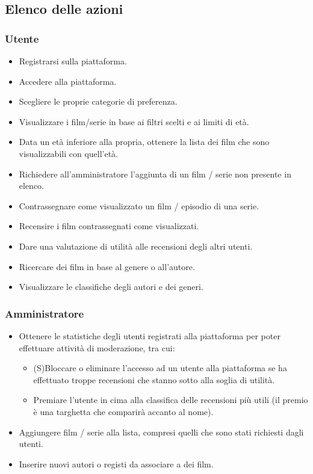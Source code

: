\documentclass[a4paper,12pt]{report}
\begin{document}
\subsection{Elenco delle azioni}
\subsubsection{Utente}
\begin{itemize}
	\item Registrarsi sulla piattaforma.
	\item Accedere alla piattaforma.
	\item Scegliere le proprie categorie di preferenza.
	\item Visualizzare i film/serie in base ai filtri scelti e ai limiti di età.
	\item Data un età inferiore alla propria, ottenere la lista dei film che sono visualizzabili con quell'età.
	\item Richiedere all'amministratore l'aggiunta di un film / serie non presente in elenco.
	\item Contrassegnare come visualizzato un film / episodio di una serie.
	\item Recensire i film contrassegnati come visualizzati.
	\item Dare una valutazione di utilità alle recensioni degli altri utenti.
	\item Ricercare dei film in base al genere o all'autore.
	\item Visualizzare le classifiche degli autori e dei generi.
\end{itemize}
\subsubsection{Amministratore}
\begin{itemize}
	\item Ottenere le statistiche degli utenti registrati alla piattaforma per poter effettuare attività di moderazione, tra cui:
	      \begin{itemize}
		      \item (S)Bloccare o eliminare l'accesso ad un utente alla piattaforma se ha effettuato troppe recensioni che stanno sotto alla soglia di utilità.
		      \item Premiare l'utente in cima alla classifica delle recensioni più utili (il premio è una targhetta che comparirà accanto al nome).
	      \end{itemize}
	\item Aggiungere film / serie alla lista, compresi quelli che sono stati richiesti dagli utenti.
	\item Inserire nuovi autori o registi da associare a dei film.
\end{itemize}
\end{document}
